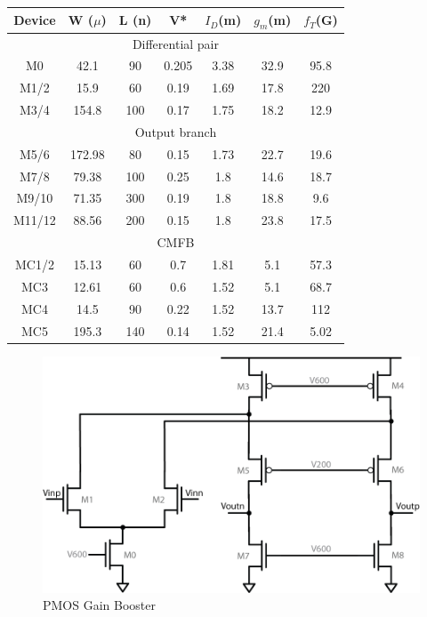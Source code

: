 \documentclass[conference]{IEEEtran}
\begin{document}
\begin{center}
\begin{tabular}{|c|c|c|c|c|c|c|} 
\hline
Device & W ($\mu$) & L (n) & V* & $I_D$(m) & $g_m$(m) & $f_T$(G) \\
\hline
\multicolumn{7}{|c|}{Differential pair} \\
\hline
M0 &	 42.1 & 90 & 0.205 & 3.38 & 32.9 & 95.8 \\
\hline
M1/2 &  15.9 & 60 & 0.19 & 1.69 & 17.8 & 220 \\
\hline
M3/4 & 154.8 & 100 & 0.17 & 1.75 & 18.2 & 12.9 \\
\hline
\multicolumn{7}{|c|}{Output branch} \\
\hline
M5/6 & 172.98 & 80 & 0.15 & 1.73 & 22.7 & 19.6 \\
\hline
M7/8 & 79.38 & 100 & 0.25 & 1.8 & 14.6 & 18.7 \\
\hline
M9/10 & 71.35 & 300 & 0.19 & 1.8 & 18.8 & 9.6 \\
\hline
M11/12 & 88.56 & 200 & 0.15 & 1.8 & 23.8 & 17.5 \\ %
\hline
\multicolumn{7}{|c|}{CMFB} \\
\hline
MC1/2 & 15.13 & 60 & 0.7 & 1.81 & 5.1 & 57.3 \\
\hline
MC3 & 12.61 & 60 & 0.6 & 1.52 & 5.1 & 68.7 \\
\hline
MC4 & 14.5 & 90 & 0.22 & 1.52 & 13.7 & 112 \\
\hline
MC5 & 195.3 & 140 & 0.14 & 1.52 & 21.4 & 5.02 \\
\hline
\end{tabular}
\end{center}


\begin{figure}[h]
\centering
\includegraphics[width=0.75\linewidth]{illus/pmos_boost}
\caption{PMOS Gain Booster}
\label{fig:pmos_boost}
\end{figure}
\end{document}
